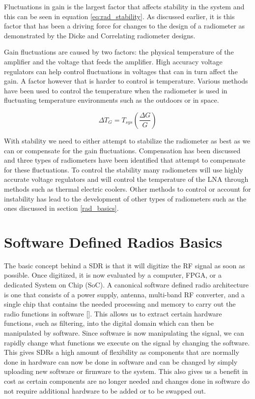 Fluctuations in gain is the largest factor that affects stability in the system and this can be seen in equation \ref{eq:rad_stability}.  As discussed earlier, it is this factor that has been a driving force for changes to the design of a radiometer as demonstrated by the Dicke and Correlating radiometer designs.  

Gain fluctuations are caused by two factors: the physical temperature of the amplifier and the voltage that feeds the amplifier.  High accuracy voltage regulators can help control fluctuations in voltages that can in turn affect the gain.  A factor however that is harder to control is temperature.  Various methods have been used to control the temperature when the radiometer is used in fluctuating temperature environments such as the outdoors or in space.  

\begin{equation} \label{eq:rad_stability}
\Delta T_G=T_{sys} \left(\frac{\Delta G}{G}\right)
\end{equation}

With stability we need to either attempt to stabilize the radiometer as best as we can or compensate for the gain fluctuations.  Compensation has been discussed and three types of radiometers have been identified that attempt to compensate for these fluctuations.  To control the stability many radiometers will use highly accurate voltage regulators and will control the temperature of the LNA through methods such as thermal electric coolers.  Other methods to control or account for instability has lead to the development of other types of radiometers such as the ones discussed in section \ref{rad_basics}.

 
\section{Software Defined Radios Basics} 
The basic concept behind a SDR is that it will digitize the RF signal as soon as possible.  Once digitized, it is now evaluated by a computer, FPGA, or a dedicated System on Chip (SoC).  A canonical software defined radio architecture is one that consists of a power supply, antenna, multi-band RF converter, and a single chip that contains the needed processing and memory to carry out the radio functions in software [\cite{Mitola1995}]. This allows us to extract certain hardware functions, such as filtering, into the digital domain which can then be manipulated by software.  Since software is now manipulating the signal, we can rapidly change what functions we execute on the signal by changing the software.  This gives SDRs a high amount of flexibility as components that are normally done in hardware can now be done in software and can be changed by simply uploading new software or firmware to the system.  This also gives us a benefit in cost as certain components are no longer needed and changes done in software do not require additional hardware to be added or to be swapped out.

